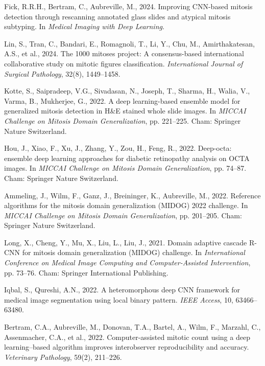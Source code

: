 \documentclass[conference]{IEEEtran}
\begin{document}
\begin{thebibliography}{}

Fick, R.R.H., Bertram, C., Aubreville, M., 2024. Improving CNN-based mitosis detection through rescanning annotated glass slides and atypical mitosis subtyping. In \textit{Medical Imaging with Deep Learning}.

Lin, S., Tran, C., Bandari, E., Romagnoli, T., Li, Y., Chu, M., Amirthakatesan, A.S., et al., 2024. The 1000 mitoses project: A consensus-based international collaborative study on mitotic figures classification. \textit{International Journal of Surgical Pathology}, 32(8), 1449–1458.

Kotte, S., Saipradeep, V.G., Sivadasan, N., Joseph, T., Sharma, H., Walia, V., Varma, B., Mukherjee, G., 2022. A deep learning-based ensemble model for generalized mitosis detection in H\&E stained whole slide images. In \textit{MICCAI Challenge on Mitosis Domain Generalization}, pp. 221–225. Cham: Springer Nature Switzerland.

Hou, J., Xiao, F., Xu, J., Zhang, Y., Zou, H., Feng, R., 2022. Deep-octa: ensemble deep learning approaches for diabetic retinopathy analysis on OCTA images. In \textit{MICCAI Challenge on Mitosis Domain Generalization}, pp. 74–87. Cham: Springer Nature Switzerland.

Ammeling, J., Wilm, F., Ganz, J., Breininger, K., Aubreville, M., 2022. Reference algorithms for the mitosis domain generalization (MIDOG) 2022 challenge. In \textit{MICCAI Challenge on Mitosis Domain Generalization}, pp. 201–205. Cham: Springer Nature Switzerland.

Long, X., Cheng, Y., Mu, X., Liu, L., Liu, J., 2021. Domain adaptive cascade R-CNN for mitosis domain generalization (MIDOG) challenge. In \textit{International Conference on Medical Image Computing and Computer-Assisted Intervention}, pp. 73–76. Cham: Springer International Publishing.

Iqbal, S., Qureshi, A.N., 2022. A heteromorphous deep CNN framework for medical image segmentation using local binary pattern. \textit{IEEE Access}, 10, 63466–63480.

Bertram, C.A., Aubreville, M., Donovan, T.A., Bartel, A., Wilm, F., Marzahl, C., Assenmacher, C.A., et al., 2022. Computer-assisted mitotic count using a deep learning–based algorithm improves interobserver reproducibility and accuracy. \textit{Veterinary Pathology}, 59(2), 211–226.


\end{thebibliography}
\end{document}
